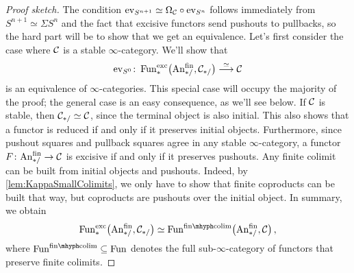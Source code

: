 \begin{proof}[Proof sketch]
	The condition $\operatorname{ev}_{S^{n+1}}\simeq \Omega_{\mathcal{C}}\circ \operatorname{ev}_{S^n}$ follows immediately from $S^{n+1}\simeq \Sigma S^n$ and the fact that excisive functors send pushouts to pullbacks, so the hard part will be to show that we get an equivalence. Let's first consider the case where $\mathcal{C}$ is a stable $\infty$-category. We'll show that
	\begin{equation*}
		\ev_{S^0}\colon \Fun_*^\mathrm{exc}\bigl(\FinAn,\Cc_{*/}\bigr)\overset{\simeq}{\longrightarrow} \Cc
	\end{equation*}
	is an equivalence of $\infty$-categories. This special case will occupy the majority of the proof; the general case is an easy consequence, as we'll see below. If $\mathcal{C}$ is stable, then $\mathcal{C}_{*/}\simeq \mathcal{C}$, since the terminal object is also initial. This also shows that a functor is reduced if and only if it preserves initial objects. Furthermore, since pushout squares and pullback squares agree in any stable $\infty$-category, a functor $F\colon \FinAn\rightarrow \Cc$ is excisive if and only if it preserves pushouts. Any finite colimit can be built from initial objects and pushouts. Indeed, by \cref{lem:KappaSmallColimits}, we only have to show that finite coproducts can be built that way, but coproducts are pushouts over the initial object. In summary, we obtain
	\begin{equation*}
		\Fun_*^\mathrm{exc}\bigl(\FinAn,\Cc_{*/}\bigr)\simeq \Fun^{\mathrm{fin}\mhyph\mathrm{colim}}\bigl(\FinAn,\Cc\bigr)\,,
	\end{equation*}
	where $\Fun^{\mathrm{fin}\mhyph\mathrm{colim}}\subseteq \Fun$ denotes the full sub-$\infty$-category of functors that preserve finite colimits.
	

\end{proof}
